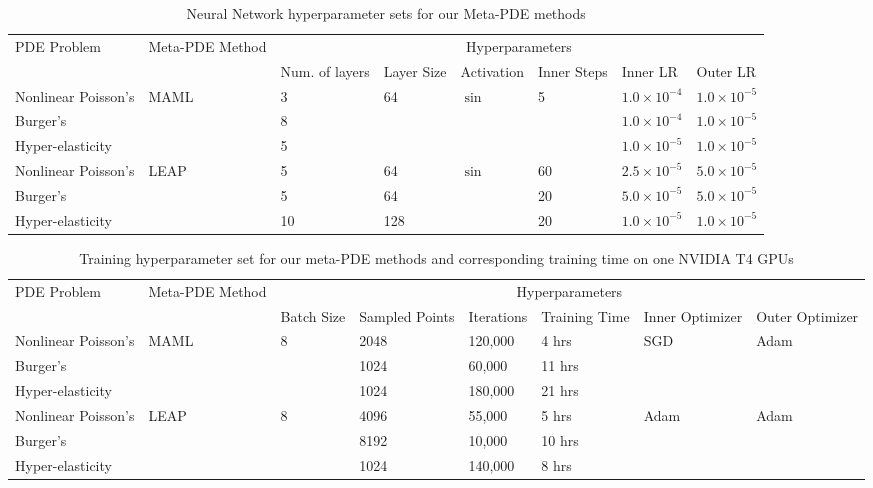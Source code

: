\begin{table}[htbp]
\caption{Neural Network hyperparameter sets for our Meta-PDE methods}
\label{tbl:hparams}
\centering
\begin{adjustbox}{max width=\textwidth}
\begin{tabular}{llllllll}
    \toprule
    PDE Problem & Meta-PDE Method & \multicolumn{6}{c}{Hyperparameters}  \\
    &  & Num. of layers & Layer Size & Activation & Inner Steps & Inner LR & Outer LR \\
    \midrule
    Nonlinear Poisson's & \multirow{3}{*}{MAML} & 3 &  \multirow{3}{*}{64} & \multirow{3}{*}{$\sin$} &  \multirow{3}{*}{5} & $1.0\times10^{-4}$ & $1.0\times10^{-5}$  \\
    Burger's &  & 8 &  &  &  & $1.0\times10^{-4} $ & $1.0\times10^{-5}$ \\
    Hyper-elasticity &  & 5 &  & &  & $1.0\times10^{-5} $ & $1.0\times10^{-5}$  \\
    \bottomrule
    Nonlinear Poisson's & \multirow{3}{*}{LEAP} & 5 & 64 & \multirow{3}{*}{$\sin$} & 60 & $2.5\times10^{-5} $ & $5.0\times10^{-5}$  \\
    Burger's &  & 5 & 64 & & 20 & $5.0\times10^{-5} $ & $5.0\times10^{-5}$  \\
    Hyper-elasticity &  & 10 & 128 &  & 20 & $1.0\times10^{-5} $ & $1.0\times10^{-5}$  \\
    \bottomrule
  \end{tabular}
\end{adjustbox}
\end{table}


\begin{table}[htbp]
\caption{\small 
Training hyperparameter set for our meta-PDE methods and corresponding training time on one NVIDIA T4 GPUs}
\label{tbl:training}
\centering
\begin{adjustbox}{max width=\textwidth}
\begin{tabular}{llllllll}
    \toprule
    PDE Problem & Meta-PDE Method & \multicolumn{6}{c}{Hyperparameters}  \\
    & & Batch Size & Sampled Points & Iterations & Training Time & Inner Optimizer & Outer Optimizer \\
    \midrule
    Nonlinear Poisson's & \multirow{3}{*}{MAML} & \multirow{3}{*}{8} & 2048 & 120,000 & 4 hrs & \multirow{3}{*}{SGD} & \multirow{3}{*}{Adam} \\
    Burger's &   &  & 1024 & 60,000 & 11 hrs  &  & \\
    Hyper-elasticity &   &  & 1024 & 180,000 & 21 hrs &  & \\
    \midrule
    Nonlinear Poisson's & \multirow{3}{*}{LEAP}  & \multirow{3}{*}{8} & 4096 & 55,000 & 5 hrs  &  \multirow{3}{*}{Adam} &  \multirow{3}{*}{Adam}\\
    Burger's &   &  & 8192 & 10,000 & 10 hrs &  & \\
    Hyper-elasticity &   &  & 1024 & 140,000 & 8 hrs &  & \\
    \bottomrule
  \end{tabular}
\end{adjustbox}
\end{table}

